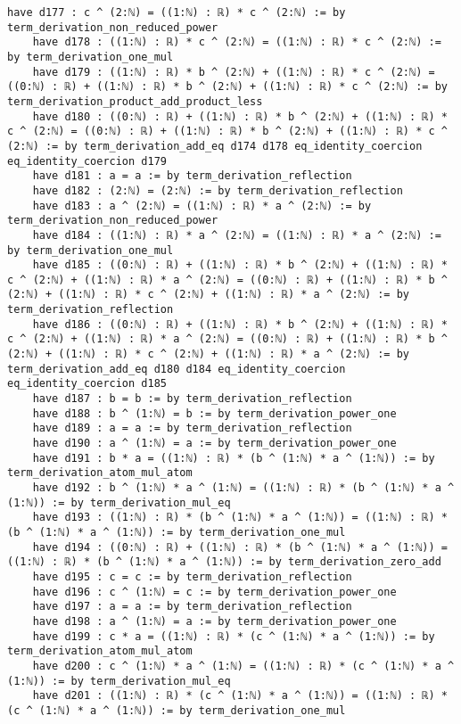\documentclass{article}
\begin{document}
\begin{tcolorbox}[colback=white!10, width=\linewidth]
\begin{lstlisting}[language=Lean4]
    have d177 : c ^ (2:ℕ) = ((1:ℕ) : ℝ) * c ^ (2:ℕ) := by term_derivation_non_reduced_power
    have d178 : ((1:ℕ) : ℝ) * c ^ (2:ℕ) = ((1:ℕ) : ℝ) * c ^ (2:ℕ) := by term_derivation_one_mul
    have d179 : ((1:ℕ) : ℝ) * b ^ (2:ℕ) + ((1:ℕ) : ℝ) * c ^ (2:ℕ) = ((0:ℕ) : ℝ) + ((1:ℕ) : ℝ) * b ^ (2:ℕ) + ((1:ℕ) : ℝ) * c ^ (2:ℕ) := by term_derivation_product_add_product_less
    have d180 : ((0:ℕ) : ℝ) + ((1:ℕ) : ℝ) * b ^ (2:ℕ) + ((1:ℕ) : ℝ) * c ^ (2:ℕ) = ((0:ℕ) : ℝ) + ((1:ℕ) : ℝ) * b ^ (2:ℕ) + ((1:ℕ) : ℝ) * c ^ (2:ℕ) := by term_derivation_add_eq d174 d178 eq_identity_coercion eq_identity_coercion d179
    have d181 : a = a := by term_derivation_reflection
    have d182 : (2:ℕ) = (2:ℕ) := by term_derivation_reflection
    have d183 : a ^ (2:ℕ) = ((1:ℕ) : ℝ) * a ^ (2:ℕ) := by term_derivation_non_reduced_power
    have d184 : ((1:ℕ) : ℝ) * a ^ (2:ℕ) = ((1:ℕ) : ℝ) * a ^ (2:ℕ) := by term_derivation_one_mul
    have d185 : ((0:ℕ) : ℝ) + ((1:ℕ) : ℝ) * b ^ (2:ℕ) + ((1:ℕ) : ℝ) * c ^ (2:ℕ) + ((1:ℕ) : ℝ) * a ^ (2:ℕ) = ((0:ℕ) : ℝ) + ((1:ℕ) : ℝ) * b ^ (2:ℕ) + ((1:ℕ) : ℝ) * c ^ (2:ℕ) + ((1:ℕ) : ℝ) * a ^ (2:ℕ) := by term_derivation_reflection
    have d186 : ((0:ℕ) : ℝ) + ((1:ℕ) : ℝ) * b ^ (2:ℕ) + ((1:ℕ) : ℝ) * c ^ (2:ℕ) + ((1:ℕ) : ℝ) * a ^ (2:ℕ) = ((0:ℕ) : ℝ) + ((1:ℕ) : ℝ) * b ^ (2:ℕ) + ((1:ℕ) : ℝ) * c ^ (2:ℕ) + ((1:ℕ) : ℝ) * a ^ (2:ℕ) := by term_derivation_add_eq d180 d184 eq_identity_coercion eq_identity_coercion d185
    have d187 : b = b := by term_derivation_reflection
    have d188 : b ^ (1:ℕ) = b := by term_derivation_power_one
    have d189 : a = a := by term_derivation_reflection
    have d190 : a ^ (1:ℕ) = a := by term_derivation_power_one
    have d191 : b * a = ((1:ℕ) : ℝ) * (b ^ (1:ℕ) * a ^ (1:ℕ)) := by term_derivation_atom_mul_atom
    have d192 : b ^ (1:ℕ) * a ^ (1:ℕ) = ((1:ℕ) : ℝ) * (b ^ (1:ℕ) * a ^ (1:ℕ)) := by term_derivation_mul_eq
    have d193 : ((1:ℕ) : ℝ) * (b ^ (1:ℕ) * a ^ (1:ℕ)) = ((1:ℕ) : ℝ) * (b ^ (1:ℕ) * a ^ (1:ℕ)) := by term_derivation_one_mul
    have d194 : ((0:ℕ) : ℝ) + ((1:ℕ) : ℝ) * (b ^ (1:ℕ) * a ^ (1:ℕ)) = ((1:ℕ) : ℝ) * (b ^ (1:ℕ) * a ^ (1:ℕ)) := by term_derivation_zero_add
    have d195 : c = c := by term_derivation_reflection
    have d196 : c ^ (1:ℕ) = c := by term_derivation_power_one
    have d197 : a = a := by term_derivation_reflection
    have d198 : a ^ (1:ℕ) = a := by term_derivation_power_one
    have d199 : c * a = ((1:ℕ) : ℝ) * (c ^ (1:ℕ) * a ^ (1:ℕ)) := by term_derivation_atom_mul_atom
    have d200 : c ^ (1:ℕ) * a ^ (1:ℕ) = ((1:ℕ) : ℝ) * (c ^ (1:ℕ) * a ^ (1:ℕ)) := by term_derivation_mul_eq
    have d201 : ((1:ℕ) : ℝ) * (c ^ (1:ℕ) * a ^ (1:ℕ)) = ((1:ℕ) : ℝ) * (c ^ (1:ℕ) * a ^ (1:ℕ)) := by term_derivation_one_mul

\end{lstlisting}
\end{tcolorbox}
\end{document}
